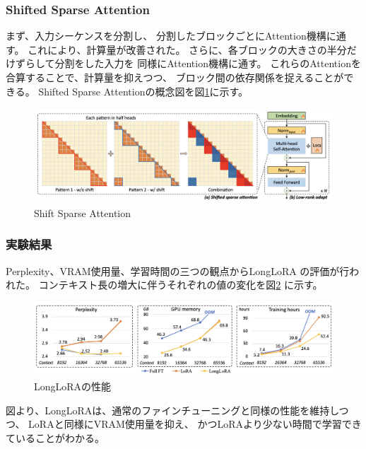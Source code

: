 \documentclass{jsarticle}
\begin{document}
        \subsubsection{Shifted Sparse Attention}
            まず、入力シーケンスを分割し、
            分割したブロックごとにAttention機構に通す。
            これにより、計算量が改善された。
            さらに、各ブロックの大きさの半分だけずらして分割をした入力を
            同様にAttention機構に通す。
            これらのAttentionを合算することで、計算量を抑えつつ、
            ブロック間の依存関係を捉えることができる。
            Shifted Sparse Attentionの概念図を図\ref{fig:SSA}に示す。
            \begin{figure}[ht]
                \centering
                \includegraphics[width=\hsize]{ssa.png}
                \caption{Shift Sparse Attention\cite{longlora}}
                \label{fig:SSA}
            \end{figure}

        \subsubsection{実験結果}
            Perplexity、VRAM使用量、学習時間の三つの観点からLongLoRA
            の評価が行われた。
            コンテキスト長の増大に伴うそれぞれの値の変化を図\ref{fig:longlora}
            に示す。
            \begin{figure}[ht]
                \centering
                \includegraphics[width=\hsize]{longlora.png}
                \caption{LongLoRAの性能\cite{longlora}}
                \label{fig:longlora}
            \end{figure}

            図より、LongLoRAは、通常のファインチューニングと同様の性能を維持しつつ、
            LoRAと同様にVRAM使用量を抑え、
            かつLoRAより少ない時間で学習できていることがわかる。
\end{document}

